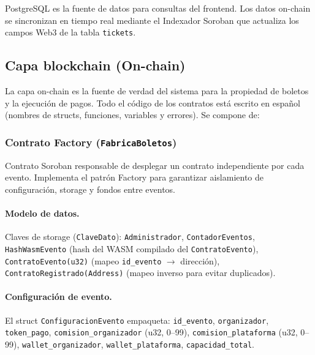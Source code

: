 \documentclass[12pt,oneside]{article}
\begin{document}
PostgreSQL es la fuente de datos para consultas del frontend. Los datos on-chain se sincronizan en tiempo real mediante el Indexador Soroban que actualiza los campos Web3 de la tabla \texttt{tickets}.

\subsection{Capa blockchain (On-chain)}

La capa on-chain es la fuente de verdad del sistema para la propiedad de boletos y la ejecución de pagos. Todo el código de los contratos está escrito en español (nombres de structs, funciones, variables y errores). Se compone de:

\subsubsection{Contrato Factory (\texttt{FabricaBoletos})}

Contrato Soroban responsable de desplegar un contrato independiente por cada evento. Implementa el patrón Factory para garantizar aislamiento de configuración, storage y fondos entre eventos.

\paragraph{Modelo de datos.} Claves de storage (\texttt{ClaveDato}): \texttt{Administrador}, \texttt{ContadorEventos}, \texttt{HashWasmEvento} (hash del WASM compilado del \texttt{ContratoEvento}), \texttt{ContratoEvento(u32)} (mapeo \texttt{id\_evento} $\rightarrow$ dirección), \texttt{ContratoRegistrado(Address)} (mapeo inverso para evitar duplicados).

\paragraph{Configuración de evento.} El struct \texttt{ConfiguracionEvento} empaqueta: \texttt{id\_evento}, \texttt{organizador}, \texttt{token\_pago}, \texttt{comision\_organizador} (u32, 0--99), \texttt{comision\_plataforma} (u32, 0--99), \texttt{wallet\_organizador}, \texttt{wallet\_plataforma}, \texttt{capacidad\_total}.
\end{document}
